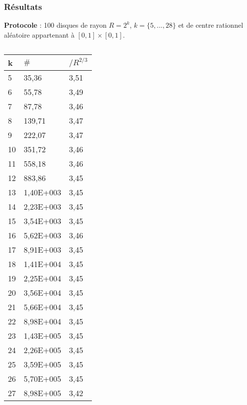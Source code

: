 \begin{frame}
\frametitle{Résultats}

\begin{block}{}
  \textbf{Protocole} : 100 disques de rayon $R = 2^k$, $k = \{5,...,28\}$ et de centre rationnel aléatoire appartenant à $[0,1]\times[0,1]$.
\end{block}


\begin{columns}[t]
  \begin{column}{0.2\linewidth}
    \vspace{-0.8cm}
    \begin{tiny}
      \begin{table}[H]
        \begin{tabular}{|p{0.018cm}|p{0.8cm}|p{0.25cm}|}
          \hline
          k  & $\#$      & $/ R^{2/3}$ \\    
          \hline
          5  & 35,36     & 3,51\\
          6  & 55,78     & 3,49\\
          7  & 87,78     & 3,46\\
          8  & 139,71    & 3,47\\
          9  & 222,07    & 3,47\\
          10 & 351,72    & 3,46\\
          11 & 558,18    & 3,46\\
          12 & 883,86    & 3,45\\
          13 & 1,40E+003 & 3,45\\
          14 & 2,23E+003 & 3,45\\
          15 & 3,54E+003 & 3,45\\
          16 & 5,62E+003 & 3,46\\
          17 & 8,91E+003 & 3,45\\
          18 & 1,41E+004 & 3,45\\
          19 & 2,25E+004 & 3,45\\
          20 & 3,56E+004 & 3,45\\
          21 & 5,66E+004 & 3,45\\
          22 & 8,98E+004 & 3,45\\
          23 & 1,43E+005 & 3,45\\
          24 & 2,26E+005 & 3,45\\
          25 & 3,59E+005 & 3,45\\
          26 & 5,70E+005 & 3,45\\
          27 & 8,98E+005 & 3,42\\

\end{tabular}
\end{table}
\end{tiny}
\end{column}
\end{columns}
\end{frame}

